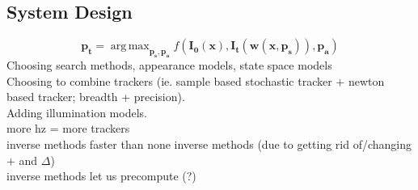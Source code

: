 \documentclass{article}
\DeclareMathOperator*{\argmax}{arg\,max}
\begin{document}
\subsection{System Design}
\[
    \mathbf{p_t} = \argmax_\mathbf{p_s,p_a} f(\mathbf{I_0}(\mathbf x), \mathbf{I_t}(\mathbf w (\mathbf x, \mathbf{p_s})), \mathbf{p_a})
\]
\noindent
Choosing search methods, appearance models, state space models\\
Choosing to combine trackers (ie. sample based stochastic tracker + newton based tracker; breadth + precision).
\\
Adding illumination models.
\\[10pt]
more hz = more trackers\\
inverse methods faster than none inverse methods (due to getting rid of/changing $+$ and $\Delta$)\\
inverse methods let us precompute (?)


\end{document}
